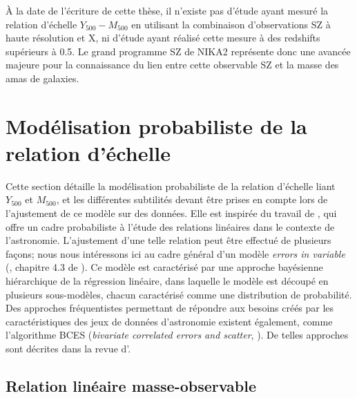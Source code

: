 À la date de l'écriture de cette thèse, il n'existe pas d'étude ayant mesuré la relation d'échelle $Y_{500}-M_{500}$ en utilisant la combinaison d'observations SZ à haute résolution et X, ni d'étude ayant réalisé cette mesure à des redshifts supérieurs à 0.5.
Le grand programme SZ de NIKA2 représente donc une avancée majeure pour la connaissance du lien entre cette observable SZ et la masse des amas de galaxies.

\section{Modélisation probabiliste de la relation d'échelle}
\label{sec:scaling:model}

Cette section détaille la modélisation probabiliste de la relation d'échelle liant $Y_{500}$ et $M_{500}$, et les différentes subtilités devant être prises en compte lors de l'ajustement de ce modèle sur des données.
Elle est inspirée du travail de , qui offre un cadre probabiliste à l'étude des relations linéaires dans le contexte de l'astronomie.
L'ajustement d'une telle relation peut être effectué de plusieurs façons; nous nous intéressons ici au cadre général d'un modèle \textit{errors in variable} (\cite{dellaportas_bayesian_1995, dagostini_fits_2005, feigelson_modern_2012}, chapitre 4.3 de \cite{hilbe_bayesian_2017}).
Ce modèle est caractérisé par une approche bayésienne hiérarchique de la régression linéaire, dans laquelle le modèle est découpé en plusieurs sous-modèles, chacun caractérisé comme une distribution de probabilité.
Des approches fréquentistes permettant de répondre aux besoins créés par les caractéristiques des jeux de données d'astronomie existent également, comme l'algorithme BCES (\textit{bivariate correlated errors and scatter}, \cite{akritas_linear_1996}).
De telles approches sont décrites dans la revue d'.

\subsection{Relation linéaire masse-observable}

